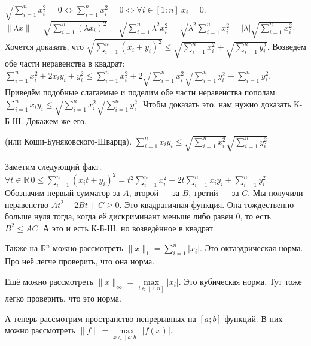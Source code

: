 \documentclass{article}
\begin{document}
\begin{itemize}
\begin{Example}
            $\sqrt{\sum\limits_{i=1}^nx_i^2}=0\Leftrightarrow\sum\limits_{i=1}^nx_i^2=0\Leftrightarrow\forall i\in[1:n]~x_i=0$.\\
            $\|\lambda x\|=\sqrt{\sum\limits_{i=1}^n(\lambda x_i)^2}=\sqrt{\sum\limits_{i=1}^n\lambda^2x_i^2}=\sqrt{\lambda^2\sum\limits_{i=1}^nx_i^2}=|\lambda|\sqrt{\sum\limits_{i=1}^nx_i^2}$.\\
            Хочется доказать, что $\sqrt{\sum\limits_{i=1}^n(x_i+y_i)^2}\leqslant\sqrt{\sum\limits_{i=1}^nx_i^2}+\sqrt{\sum\limits_{i=1}^ny_i^2}$. Возведём обе части неравенства в квадрат: $\sum\limits_{i=1}^nx_i^2+2x_iy_i+y_i^2\leqslant\sum\limits_{i=1}^nx_i^2+2\sqrt{\sum\limits_{i=1}^nx_i^2}\sqrt{\sum\limits_{i=1}^ny_i^2}+\sum\limits_{i=1}^ny_i^2$. Приведём подобные слагаемые и поделим обе части неравенства пополам: $\sum\limits_{i=1}^nx_iy_i\leqslant\sqrt{\sum\limits_{i=1}^nx_i^2}\sqrt{\sum\limits_{i=1}^ny_i^2}$. Чтобы доказать это, нам нужно доказать К-Б-Ш. Докажем же его.
        \end{Example}
        \thm {} (или Коши-Буняковского-Шварца). $\sum\limits_{i=1}^nx_iy_i\leqslant\sqrt{\sum\limits_{i=1}^nx_i^2}\sqrt{\sum\limits_{i=1}^ny_i^2}$
        \begin{Proof}
            Заметим следующий факт. $\forall t\in\mathbb R~0\leqslant\sum\limits_{i=1}^n(x_it+y_i)^2=t^2\sum\limits_{i=1}^nx_i^2+2t\sum\limits_{i=1}^nx_iy_i+\sum\limits_{i=1}^ny_i^2$. Обозначим первый сумматор за $A$, второй --- за $B$, третий --- за $C$. Мы получили неравенство $At^2+2Bt+C\geqslant0$. Это квадратичная функция. Она тождественно больше нуля тогда, когда её дискриминант меньше либо равен 0, то есть $B^2\leqslant AC$. А это и есть К-Б-Ш, но возведённое в квадрат.
        \end{Proof}
        \begin{Example}
            Также на $\mathbb R^n$ можно рассмотреть $\|x\|_1=\sum\limits_{i=1}^n|x_i|$. Это октаэдрическая норма. Про неё легче проверить, что она норма.
        \end{Example}
        \begin{Example}
            Ещё можно рассмотреть $\|x\|_\infty=\max\limits_{i\in[1:n]}|x_i|$. Это кубическая норма. Тут тоже легко проверить, что это норма.
        \end{Example}
        \begin{Example}
            А теперь рассмотрим пространство непрерывных на $[a;b]$ функций. В них можно рассмотреть $\|f\|=\max\limits_{x\in[a;b]}|f(x)|$.

\end{Example}
\end{itemize}
\end{document}
